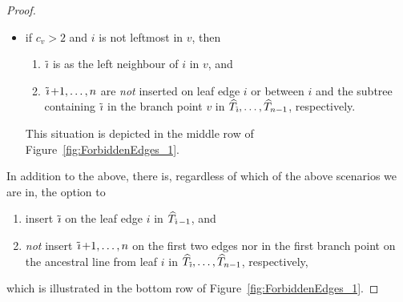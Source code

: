 \documentclass[a4paper, final]{amsart}
\theoremstyle{plain}
\theoremstyle{definition}
\newcommand{\That}[1][T]{\widehat{#1}}
\DeclareMathOperator{\tildei}{\tilde{\textit{\i}}}
\begin{document}
\begin{proof}
\begin{itemize}
          \item if $c_v > 2$ and $i$ is not leftmost in $v$, then
            \begin{enumerate}
              \item $\tildei$ is as the left neighbour of $i$ in $v$, and
              \item $\tildei + 1, \ldots, n$ are \textit{not} inserted on leaf edge $i$ or between $i$ and the subtree containing $\tildei$ in the branch point $v$ in $\That_{\tildei}, \ldots, \That_{n-1}$, respectively.
            \end{enumerate}
            This situation is depicted in the middle row of Figure~\ref{fig:ForbiddenEdges_1}.
        \end{itemize}
        In addition to the above, there is, regardless of which of the above scenarios we are in, the option to
            \begin{enumerate}
              \item insert $\tildei$ on the leaf edge $i$ in $\That_{\tildei - 1}$, and
              \item \textit{not} insert $\tildei + 1, \ldots, n$ on the first two edges nor in the first branch point on the ancestral line from leaf $i$ in $\That_{\tildei}, \ldots, \That_{n-1}$, respectively,
            \end{enumerate}
            which is illustrated in the bottom row of Figure~\ref{fig:ForbiddenEdges_1}. \smallskip


\end{proof}
\end{document}
